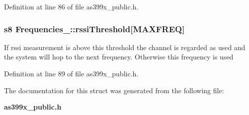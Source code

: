 Definition at line 86 of file as399x\-\_\-public.\-h.

\subsubsection[{rssi\-Threshold}]{\setlength{\rightskip}{0pt plus 5cm}s8 Frequencies\-\_\-\-::rssi\-Threshold[{\bf M\-A\-X\-F\-R\-E\-Q}]}\label{struct_frequencies___a9dca84f04528438926760e300403a526}
If rssi measurement is above this threshold the channel is regarded as used and the system will hop to the next frequency. Otherwise this frequency is used 

Definition at line 89 of file as399x\-\_\-public.\-h.



The documentation for this struct was generated from the following file\-:\begin{DoxyCompactItemize}
\item 
{\bf as399x\-\_\-public.\-h}\end{DoxyCompactItemize}
